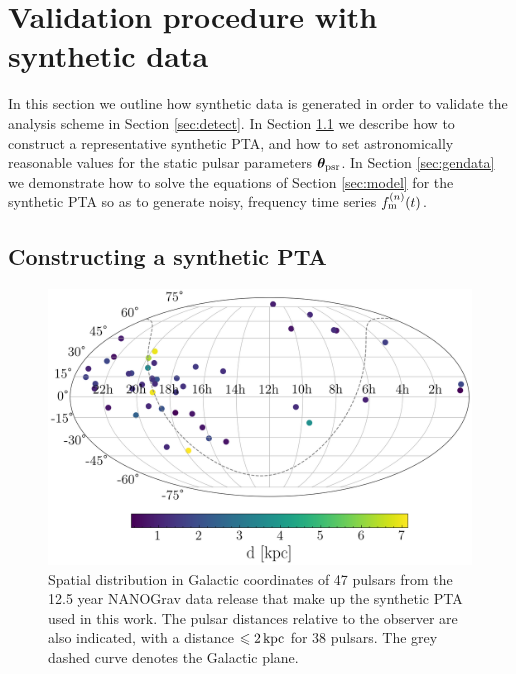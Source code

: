 \documentclass[fleqn,usenatbib,useAMS]{mnras}
\begin{document}
\section{Validation procedure with synthetic data} \label{sec:testing}
In this section we outline how synthetic data is generated in order to validate the analysis scheme in Section \ref{sec:detect}. In Section \ref{sec:synt_pta} we describe how to construct a representative synthetic PTA, and how to set astronomically reasonable values for the static pulsar parameters $\boldsymbol{\theta}_{\rm psr}$. In Section \ref{sec:gendata} we demonstrate how to solve the equations of Section \ref{sec:model} for the synthetic PTA so as to generate noisy, frequency time series $f_{\rm m}^{(n)}(t)$. 

\subsection{Constructing a synthetic PTA}\label{sec:synt_pta}
\begin{figure}
	\includegraphics[width=\columnwidth]{images/pulsar_distribution}
	\caption{Spatial distribution in Galactic coordinates of 47 pulsars from the 12.5 year NANOGrav data release that make up the synthetic PTA used in this work. The pulsar distances relative to the observer are also indicated, with a distance $\leq 2 \, {\rm kpc}$ for $38$ pulsars. The grey dashed curve denotes the Galactic plane.}
	\label{fig:pulsar_distrib}
\end{figure}
\end{document}
